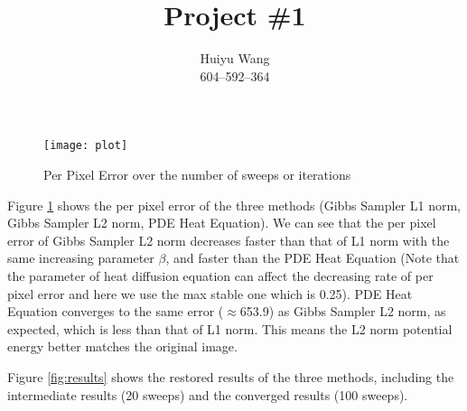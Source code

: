 \documentclass[11pt, oneside]{article}   	%
\title{Project \#1}
\author{Huiyu Wang\\604--592--364}
\date{}							%
\begin{document}
\maketitle

\begin{figure}[H]
	\centering
	\texttt{[image: plot]}
	\caption{Per Pixel Error over the number of sweeps or iterations}
	\label {fig:plot}
\end{figure}

Figure \ref{fig:plot} shows the per pixel error of the three methods (Gibbs Sampler L1 norm, Gibbs Sampler L2 norm, PDE Heat Equation).
We can see that the per pixel error of Gibbs Sampler L2 norm decreases faster than that of L1 norm with the same increasing parameter $\beta$, and faster than the PDE Heat Equation (Note that the parameter of heat diffusion equation can affect the decreasing rate of per pixel error and here we use the max stable one which is 0.25). PDE Heat Equation converges to the same error ($\approx$653.9) as Gibbs Sampler L2 norm, as expected, which is less than that of L1 norm. This means the L2 norm potential energy better matches the original image.
\par
Figure \ref{fig:results} shows the restored results of the three methods, including the intermediate results (20 sweeps) and the converged results (100 sweeps).
\end{document}
